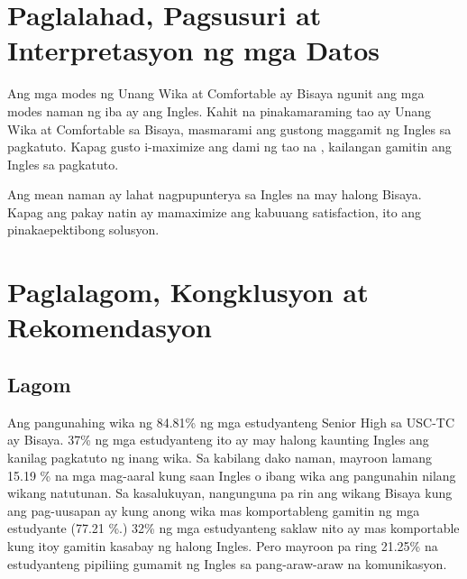 \documentclass [british, 11pt] {report}
\begin{document}
\chapter{Paglalahad, Pagsusuri at Interpretasyon ng mga Datos}

\noindent
Ang mga modes ng Unang Wika at Comfortable ay Bisaya ngunit ang mga modes naman
ng iba ay ang Ingles. Kahit na pinakamaraming tao ay Unang Wika at Comfortable
sa Bisaya, masmarami ang gustong maggamit ng Ingles sa pagkatuto. Kapag gusto
i-maximize ang dami ng tao na , kailangan gamitin ang
Ingles sa pagkatuto.

Ang mean naman ay lahat nagpupunterya sa Ingles na may halong Bisaya. Kapag
ang pakay natin ay mamaximize ang kabuuang \gls{satisfaction}, ito ang
pinakaepektibong solusyon.


\chapter{Paglalagom, Kongklusyon at Rekomendasyon}
\section{Lagom}
Ang pangunahing wika ng 84.81\% ng mga estudyanteng Senior High sa USC-TC ay
Bisaya. 37\% ng mga estudyanteng ito ay may halong kaunting Ingles ang kanilag
pagkatuto ng inang wika. Sa kabilang dako naman, mayroon lamang 15.19 \% na mga
mag-aaral kung saan Ingles o ibang wika ang pangunahin nilang wikang natutunan.
Sa kasalukuyan, nangunguna pa rin ang wikang Bisaya kung ang pag-uusapan ay kung
anong wika mas komportableng gamitin ng mga estudyante (77.21 \%.) 32\% ng mga
estudyanteng saklaw nito ay mas komportable kung itoy gamitin kasabay ng halong
Ingles. Pero mayroon pa ring 21.25\% na estudyanteng pipiliing gumamit ng Ingles
sa pang-araw-araw na komunikasyon.
\end{document}
